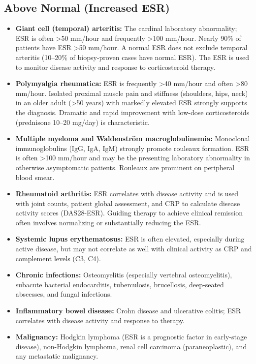 \subsection*{Above Normal (Increased ESR)}
\begin{itemize}
  \item \textbf{Giant cell (temporal) arteritis:} The cardinal laboratory abnormality; ESR is often >50 mm/hour and frequently >100 mm/hour. Nearly 90\% of patients have ESR >50 mm/hour. A normal ESR does not exclude temporal arteritis (10--20\% of biopsy-proven cases have normal ESR). The ESR is used to monitor disease activity and response to corticosteroid therapy.
  \item \textbf{Polymyalgia rheumatica:} ESR is frequently >40 mm/hour and often >80 mm/hour. Isolated proximal muscle pain and stiffness (shoulders, hips, neck) in an older adult (>50 years) with markedly elevated ESR strongly supports the diagnosis. Dramatic and rapid improvement with low-dose corticosteroids (prednisone 10--20 mg/day) is characteristic.
  \item \textbf{Multiple myeloma and Waldenstr\"{o}m macroglobulinemia:} Monoclonal immunoglobulins (IgG, IgA, IgM) strongly promote rouleaux formation. ESR is often >100 mm/hour and may be the presenting laboratory abnormality in otherwise asymptomatic patients. Rouleaux are prominent on peripheral blood smear.
  \item \textbf{Rheumatoid arthritis:} ESR correlates with disease activity and is used with joint counts, patient global assessment, and CRP to calculate disease activity scores (DAS28-ESR). Guiding therapy to achieve clinical remission often involves normalizing or substantially reducing the ESR.
  \item \textbf{Systemic lupus erythematosus:} ESR is often elevated, especially during active disease, but may not correlate as well with clinical activity as CRP and complement levels (C3, C4).
  \item \textbf{Chronic infections:} Osteomyelitis (especially vertebral osteomyelitis), subacute bacterial endocarditis, tuberculosis, brucellosis, deep-seated abscesses, and fungal infections.
  \item \textbf{Inflammatory bowel disease:} Crohn disease and ulcerative colitis; ESR correlates with disease activity and response to therapy.
  \item \textbf{Malignancy:} Hodgkin lymphoma (ESR is a prognostic factor in early-stage disease), non-Hodgkin lymphoma, renal cell carcinoma (paraneoplastic), and any metastatic malignancy.

\end{itemize}
